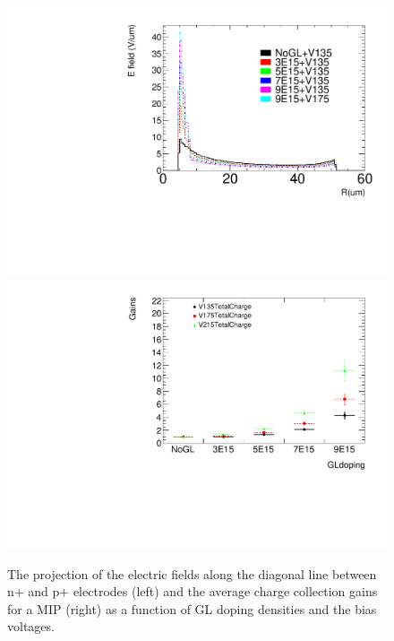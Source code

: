 \documentclass[aps,pt14,superscriptaddress,floatfix,nofootinbib]{revtex4}
\begin{document}
\begin{figure}[hbtp]
\begin{center}
\includegraphics[width=0.35\textheight,keepaspectratio]{figures/Electric_field_IBLGAD5E_summary.pdf}
\includegraphics[width=0.35\textheight,keepaspectratio]{figures/Anatiming_timing3DIBLGAD5E_Plots_TotalChargeGLdoping.pdf}
\caption{The projection of the electric fields along the diagonal line between n+ and p+ electrodes (left) and 
the average charge collection gains for a MIP (right) as a function of GL doping densities and the bias voltages.~\label{fig:kdetgain}}
\end{center}
\end{figure}
\end{document}
